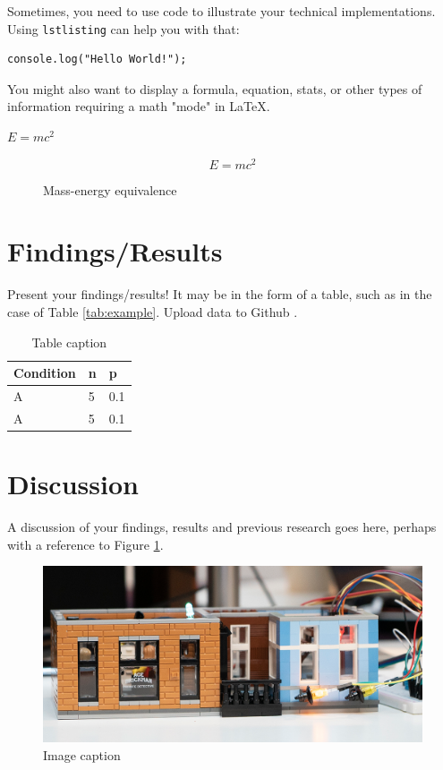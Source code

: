 \documentclass[fleqn,10pt]{wlscirep}
\begin{document}
Sometimes, you need to use code to illustrate your technical implementations.
Using \texttt{lstlisting} can help you with that:

\begin{lstlisting}[caption=Displaying Hello World in JavaScript]
console.log("Hello World!");
\end{lstlisting}


You might also want to display a formula, equation, stats, or other types of information requiring a math "mode" in \LaTeX.

$E=mc^2$

\begin{figure}[h]
\[ E = m c^2 \]
\caption{Mass-energy equivalence}
\end{figure}

\section{Findings/Results}
Present your findings/results! 
It may be in the form of a table, such as in the case of Table \ref{tab:example}.
Upload data to Github \cite{Github_undated-kr}.

\begin{table}[ht]
\centering
\begin{tabular}{|l|l|l|}
\hline
\textbf{Condition} & \textbf{n} & \textbf{p} \\
\hline
A & 5 & 0.1 \\
A & 5 & 0.1 \\
\hline
\end{tabular}
\caption{Table caption}
\end{table}

\section{Discussion}
A discussion of your findings, results and previous research goes here, perhaps with a reference to Figure \ref{fig:figure_label}.

\begin{figure}[!h]
\centering
\includegraphics[width=0.5\linewidth]{images/sample_image.png}
\caption{Image caption}
\label{fig:figure_label}
\end{figure}
\end{document}
